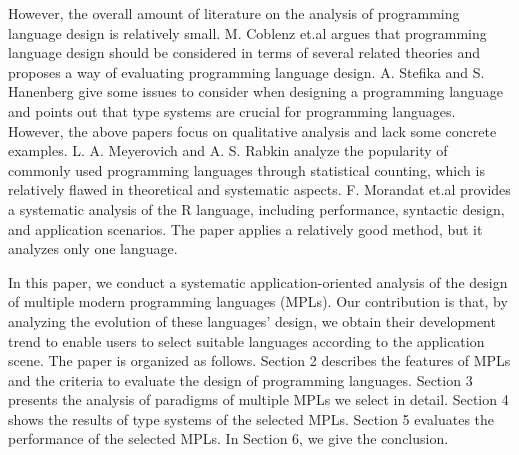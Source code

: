 However, the overall amount of literature on the analysis of
programming language design is relatively small.
M. Coblenz et.al argues that programming language design should be considered in terms
of several related theories and proposes a way of evaluating programming
language design\cite{coblenz2018interdisciplinary}.
A. Stefika and S. Hanenberg give some issues to consider when designing
a programming language and points out that type systems are crucial for
programming languages\cite{stefik2014programming}.
However, the above papers focus on qualitative analysis and lack
some concrete examples.
L. A. Meyerovich and A. S. Rabkin analyze the popularity of commonly
used programming languages through statistical counting,
which is relatively flawed in theoretical and systematic aspects\cite{meyerovich2013empirical}.
F. Morandat et.al provides a systematic analysis of the R language,
including performance, syntactic design, and application scenarios\cite{morandat2012evaluating}.
The paper applies a relatively good method, but it analyzes only one language.

In this paper, we conduct a systematic application-oriented analysis of the design of
multiple modern programming languages (MPLs).
Our contribution is that, by analyzing the evolution of these languages' design,
we obtain their development trend to enable users to select suitable languages according to the application scene.
The paper is organized as follows.
Section 2 describes the features of MPLs and the criteria to evaluate the design of programming languages.
Section 3 presents the analysis of paradigms of multiple MPLs we select in detail.
Section 4 shows the results of type systems of the selected MPLs.
Section 5 evaluates the performance of the selected MPLs.
In Section 6, we give the conclusion.

